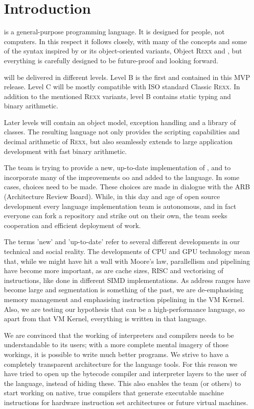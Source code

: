 \chapter{Introduction}
\crexx{} is a general-purpose programming language. It is designed for
people, not computers. In this respect it follows \rexx{} closely, with
many of the concepts and some of the syntax inspired by \rexx{}
or its object-oriented variants, Object R\textsc{exx} and \nr{}, but
everything is carefully designed to be future-proof and looking
forward.

\crexx{} will be delivered in different levels. Level B is the first and
contained in this MVP release. Level C will be mostly compatible with
ISO standard Classic \textsc{Rexx}. 
In addition to the mentioned \textsc{Rexx} variants, \crexx{} level B contains 
static typing and binary arithmetic.

Later levels will contain an object model, exception
handling and a library of classes. The resulting language not only provides the scripting
capabilities and decimal arithmetic of R\textsc{exx}, but also seamlessly
extends to large application development with fast binary arithmetic.

The \crexx{} team is trying to provide a new, up-to-date
implementation of \rexx{}, and to incorporate many of the improvements
oo\rexx{} and \nr{} added to the language. In some cases, choices
need to be made. These choices are made in dialogue with the \rexx ARB
(Architecture Review Board). While, in this day and age of open source
development every language implementation team is autonomous, and in
fact everyone can fork a repository and strike out on their own, the
\crexx{} team seeks cooperation and efficient deployment of work.

The terms 'new' and 'up-to-date' refer to several different
developments in our technical and social reality. The developments of
CPU and GPU technology mean that, while we might have hit a wall with
Moore's law, parallellism and pipelining have become more important,
as are cache sizes, RISC and vectorising of instructions, like done in
different SIMD implementations. As address ranges have become large
and segmentation is something of the past, we are de-emphasising
memory management and emphasising instruction pipelining in the
\crexx{} VM Kernel. Also, we are testing our hypothesis that \rexx{}
can be a high-performance language, so apart from that VM Kernel,
everything is written in that language.

We are convinced that the working of interpreters and compilers needs
to be understandable to its users; with a more complete mental imagery
of those workings, it is possible to write much better programs. We
strive to have a completely transparent architecture for the language
tools. For this reason we have tried to open up the bytecode compiler
and interpreter layers to the user of the language, instead of hiding
these. This also enables the team (or others) to start working on
native, true compilers that generate executable machine instructions
for hardware instruction set architectures or future virtual machines.

